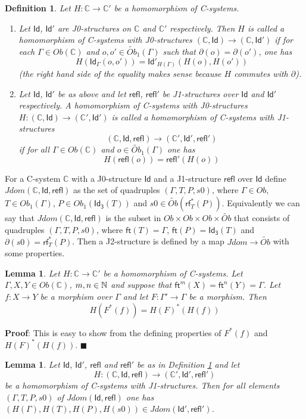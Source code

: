 \documentclass[12pt]{article}
\numberwithin{equation}{section}
\newenvironment{myproof}{{\bf Proof}:}{$\blacksquare$ \vskip 5mm }
\newtheorem{lemma}[proposition]{Lemma}
\newtheorem{definition}[proposition]{Definition}
\newcommand{\sr}{\rightarrow}
\newcommand{\nn}{{\mathbb N\rm}}
\newcommand{\wt}{\widetilde}
\newcommand{\CC}{{\mathbb C}}  %
\newcommand{\ft}{\mathsf{ft}}
\newcommand{\Id}{\mathsf{Id}} %
\newcommand{\Idx}{\mathsf{Id_3}} %
\newcommand{\refl}{\mathsf{refl}}
\newcommand{\rf}{\mathsf{rf}}
\newcommand{\Obwt}{\wt{Ob}}
\begin{document}
%
\begin{definition}
\label{2015.04.06.def1} Let $H:\CC\sr \CC'$ be a homomorphism of C-systems.
%
\begin{enumerate}
\item Let $\Id$, $\Id'$ are J0-structures on $\CC$ and $\CC'$ respectively.  Then
  $H$ is called a homomorphism of C-systems with J0-structures $(\CC,\Id)\sr
  (\CC,\Id')$ if for each $\Gamma\in Ob(\CC)$ and $o,o'\in\Obwt_1(\Gamma)$ such
  that $\partial(o)=\partial(o')$, one has
%
$$H(\Id_{\Gamma}(o,o'))=\Id'_{H(\Gamma)}(H(o),H(o'))$$
%
(the right hand side of the equality makes sense because $H$ commutes with
  $\partial$).
% 
\item Let $\Id$, $\Id'$ be as above and let $\refl$, $\refl'$ be J1-structures
  over $\Id$ and $\Id'$ respectively. A homomorphism of C-systems with
  J0-structures $H:(\CC,\Id)\sr (\CC',\Id')$ is called a homomorphism of
  C-systems with J1-structures
%
$$(\CC,\Id,\refl)\sr (\CC',\Id',\refl')$$
%
if for all $\Gamma\in Ob(\CC)$ and $o\in \Obwt_1(\Gamma)$ one has
%
$$H(\refl(o))=\refl'(H(o))$$
%
\end{enumerate}
\end{definition}
%
For a C-system $\CC$ with a J0-structure $\Id$ and a J1-structure $\refl$ over
$\Id$ define $Jdom(\CC,\Id,\refl)$ as the set of quadruples $(\Gamma,T,P,s0)$,
where $\Gamma\in Ob$, $T\in Ob_1(\Gamma)$, $P\in Ob_1(\Idx(T))$ and $s0\in
\Obwt(\rf_T^*(P))$. Equivalently we can say that $Jdom(\CC,\Id,\refl)$ is the
subset in $Ob\times Ob\times Ob\times \Obwt$ that consists of quadruples
$(\Gamma,T,P,s0)$, where $\ft(T)=\Gamma$, $\ft(P)=\Idx(T)$ and
$\partial(s0)=\rf_T^*(P)$. Then a J2-structure is defined by a map $Jdom\sr
\Obwt$ with some properties.
%
\begin{lemma}
\label{2015.04.06.l3} Let $H:\CC\sr \CC'$ be a homomorphism of C-systems. Let
$\Gamma,X,Y\in Ob(\CC)$, $m,n\in\nn$ and suppose that
$\ft^m(X)=\ft^{n}(Y)=\Gamma$. Let $f:X\sr Y$ be a morphism over $\Gamma$ and let
$F:\Gamma'\sr \Gamma$ be a morphism. Then
%
$$H(F^*(f))=H(F)^*(H(f))$$
%
\end{lemma}
%
\begin{myproof}
This is easy to show from the defining properties of $F^*(f)$ and
$H(F)^*(H(f))$.
\end{myproof}
%
%
\begin{lemma}
\label{2015.04.06.l2} Let $\Id$, $\Id'$, $\refl$ and $\refl'$ be as in
Definition \ref{2015.04.06.def1} and let
%
$$H:(\CC,\Id,\refl)\sr (\CC',\Id',\refl')$$
%
be a homomorphism of C-systems with J1-structures. Then for all elements
$(\Gamma,T,P,s0)$ of $Jdom(\Id,\refl)$ one has $(H(\Gamma),H(T),H(P),H(s0))\in
Jdom(\Id',\refl')$.
\end{lemma}
\end{document}
